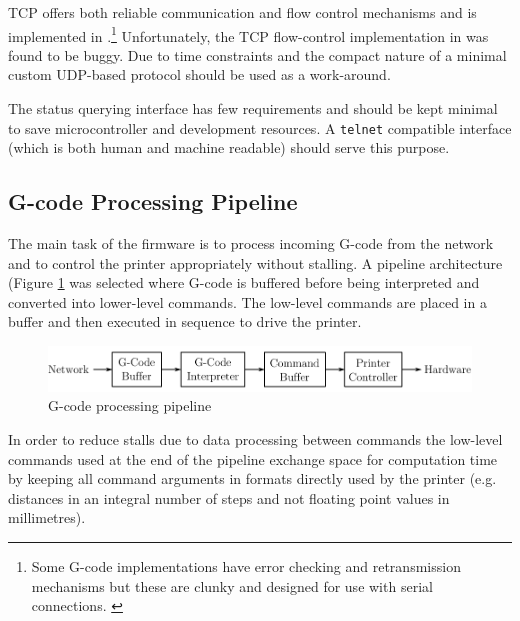 			
			TCP offers both reliable communication and flow control mechanisms and is
			implemented in \uIP{}.\footnote{Some G-code implementations have error
			checking and retransmission mechanisms but these are clunky and designed
			for use with serial connections. \cite{gcodeErrorChecking}} Unfortunately,
			the TCP flow-control implementation in \uIP{} was found to be buggy. Due
			to time constraints and the compact nature of \uIP{} a minimal custom
			UDP-based protocol should be used as a work-around.
			
			
			The status querying interface has few requirements and should be kept
			minimal to save microcontroller and development resources. A
			\verb+telnet+ compatible interface (which is both human and machine
			readable) should serve this purpose.
		
		\subsection{G-code Processing Pipeline}
			
			The main task of the firmware is to process incoming G-code from the
			network and to control the printer appropriately without stalling. A
			pipeline architecture (Figure \ref{fig:firmwarePipeline} was selected
			where G-code is buffered before being interpreted and converted into
			lower-level commands. The low-level commands are placed in a buffer and
			then executed in sequence to drive the printer.
			
			\begin{figure}[here]
				\includegraphics[width=1\textwidth]{diagrams/firmwarePipeline.pdf}
				\caption{G-code processing pipeline}
				\label{fig:firmwarePipeline}
			\end{figure}
			
			In order to reduce stalls due to data processing between commands the
			low-level commands used at the end of the pipeline exchange space for
			computation time by keeping all command arguments in formats directly used
			by the printer (e.g. distances in an integral number of steps and not
			floating point values in millimetres).
			
